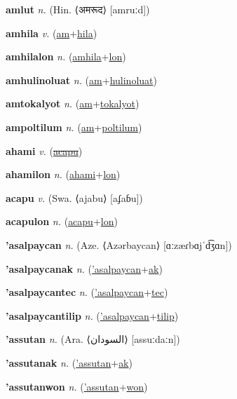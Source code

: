 \textbf{\hypertarget{amlut}{amlut}} \textit{n.} (Hin. ⟨{\devanagari{}अमरूद}⟩ [amruːd])


\textbf{\hypertarget{amhila}{amhila}} \textit{v.} (\hyperlink{am}{am}+\allowbreak \hyperlink{hila}{hila})


\textbf{\hypertarget{amhilalon}{amhilalon}} \textit{n.} (\hyperlink{amhila}{amhila}+\allowbreak \hyperlink{lon}{lon})


\textbf{\hypertarget{amhulinoluat}{amhulinoluat}} \textit{n.} (\hyperlink{am}{am}+\allowbreak \hyperlink{hulinoluat}{hulinoluat})


\textbf{\hypertarget{amtokalyot}{amtokalyot}} \textit{n.} (\hyperlink{am}{am}+\allowbreak \hyperlink{tokalyot}{tokalyot})


\textbf{\hypertarget{ampoltilum}{ampoltilum}} \textit{n.} (\hyperlink{am}{am}+\allowbreak \hyperlink{poltilum}{poltilum})


\textbf{\hypertarget{ahami}{ahami}} \textit{v.} (\hyperlink{acapu}{\sout{acapu}})


\textbf{\hypertarget{ahamilon}{ahamilon}} \textit{n.} (\hyperlink{ahami}{ahami}+\allowbreak \hyperlink{lon}{lon})


\textbf{\hypertarget{acapu}{acapu}} \textit{v.} (Swa. ⟨ajabu⟩ [aʄaɓu])


\textbf{\hypertarget{acapulon}{acapulon}} \textit{n.} (\hyperlink{acapu}{acapu}+\allowbreak \hyperlink{lon}{lon})


\textbf{\hypertarget{'asalpaycan}{'asalpaycan}} \textit{n.} (Aze. ⟨Azərbaycan⟩ [ɑːzæɾbɑjˈd͡ʒɑn])


\textbf{\hypertarget{'asalpaycanak}{'asalpaycanak}} \textit{n.} (\hyperlink{'asalpaycan}{'asalpaycan}+\allowbreak \hyperlink{ak}{ak})


\textbf{\hypertarget{'asalpaycantec}{'asalpaycantec}} \textit{n.} (\hyperlink{'asalpaycan}{'asalpaycan}+\allowbreak \hyperlink{tec}{tec})


\textbf{\hypertarget{'asalpaycantilip}{'asalpaycantilip}} \textit{n.} (\hyperlink{'asalpaycan}{'asalpaycan}+\allowbreak \hyperlink{tilip}{tilip})


\textbf{\hypertarget{'assutan}{'assutan}} \textit{n.} (Ara. ⟨{\arabics{}السودان‎}⟩ [assuːdaːn])


\textbf{\hypertarget{'assutanak}{'assutanak}} \textit{n.} (\hyperlink{'assutan}{'assutan}+\allowbreak \hyperlink{ak}{ak})


\textbf{\hypertarget{'assutanwon}{'assutanwon}} \textit{n.} (\hyperlink{'assutan}{'assutan}+\allowbreak \hyperlink{won}{won})


